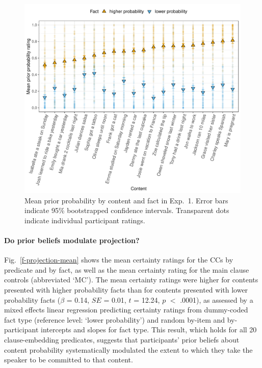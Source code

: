 \documentclass[11pt,fleqn]{article}
\newcommand{\figref}[1]{Fig.~\ref{#1}}
\newcommand{\6}{\mbox{$[\hspace*{-.6mm}[$}}
\newcommand{\9}{\mbox{$]\hspace*{-.6mm}]$}}
\begin{document}
\begin{figure}[h!]
\centering
\includegraphics[width=.7\paperwidth]{../../results/9-prior-projection/graphs/prior-ratings}

\caption{Mean prior probability by content and fact in Exp.~1. Error bars indicate 95\% bootstrapped confidence intervals. Transparent dots indicate individual participant ratings.} 
\label{f-prior}
\end{figure}

\paragraph{Do prior beliefs modulate projection?}  \figref{f-projection-mean} shows the mean certainty ratings for the CCs by  predicate and by fact, as well as the mean certainty rating for the main clause controls (abbreviated `MC'). The mean certainty ratings were higher for contents  presented with higher probability facts than for contents presented with lower probability facts ($\beta$ = 0.14, $SE$ = 0.01, $t$ = 12.24, $p$ $<$ .0001), as assessed by a mixed effects linear regression predicting certainty ratings from dummy-coded fact type (reference level: `lower probability') and random by-item and by-participant intercepts and slopes for fact type.  This result, which holds for all 20 clause-embedding predicates, suggests that participants' prior beliefs about content probability systematically modulated the extent to which they take the speaker to be committed to that content.
\end{document}
